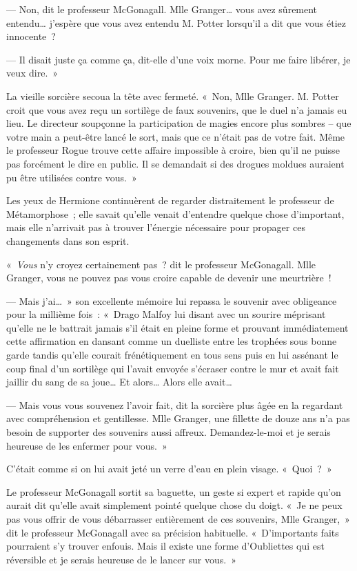 --- Non, dit le professeur McGonagall. Mlle Granger… vous avez sûrement entendu… j'espère que vous avez entendu M. Potter lorsqu'il a dit que vous étiez innocente~?

--- Il disait juste ça comme ça, dit-elle d'une voix morne. Pour me faire libérer, je veux dire.~»

La vieille sorcière secoua la tête avec fermeté. «~Non, Mlle Granger. M. Potter croit que vous avez reçu un sortilège de faux souvenirs, que le duel n'a jamais eu lieu. Le directeur soupçonne la participation de magies encore plus sombres -- que votre main a peut-être lancé le sort, mais que ce n'était pas de votre fait. Même le professeur Rogue trouve cette affaire impossible à croire, bien qu'il ne puisse pas forcément le dire en public. Il se demandait si des drogues moldues auraient pu être utilisées contre vous.~»

Les yeux de Hermione continuèrent de regarder distraitement le professeur de Métamorphose~; elle savait qu'elle venait d'entendre quelque chose d'important, mais elle n'arrivait pas à trouver l'énergie nécessaire pour propager ces changements dans son esprit.

«~\emph{Vous} n'y croyez certainement pas~? dit le professeur McGonagall. Mlle Granger, vous ne pouvez pas vous croire capable de devenir une meurtrière~!

--- Mais j'ai…~» son excellente mémoire lui repassa le souvenir avec obligeance pour la millième fois~: «~Drago Malfoy lui disant avec un sourire méprisant qu'elle ne le battrait jamais s'il était en pleine forme et prouvant immédiatement cette affirmation en dansant comme un duelliste entre les trophées sous bonne garde tandis qu'elle courait frénétiquement en tous sens puis en lui assénant le coup final d'un sortilège qui l'avait envoyée s'écraser contre le mur et avait fait jaillir du sang de sa joue… Et alors… Alors elle avait…

--- Mais vous vous souvenez l'avoir fait, dit la sorcière plus âgée en la regardant avec compréhension et gentillesse. Mlle Granger, une fillette de douze ans n'a pas besoin de supporter des souvenirs aussi affreux. Demandez-le-moi et je serais heureuse de les enfermer pour vous.~»

C'était comme si on lui avait jeté un verre d'eau en plein visage. «~Quoi~?~»

Le professeur McGonagall sortit sa baguette, un geste si expert et rapide qu'on aurait dit qu'elle avait simplement pointé quelque chose du doigt. «~Je ne peux pas vous offrir de vous débarrasser entièrement de ces souvenirs, Mlle Granger,~» dit le professeur McGonagall avec sa précision habituelle. «~D'importants faits pourraient s'y trouver enfouis. Mais il existe une forme d'Oubliettes qui est réversible et je serais heureuse de le lancer sur vous.~»

